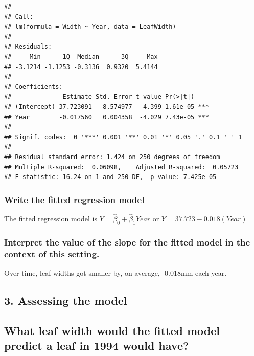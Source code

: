 \documentclass[]{article}
\begin{document}
\begin{verbatim}
## 
## Call:
## lm(formula = Width ~ Year, data = LeafWidth)
## 
## Residuals:
##     Min      1Q  Median      3Q     Max 
## -3.1214 -1.1253 -0.3136  0.9320  5.4144 
## 
## Coefficients:
##              Estimate Std. Error t value Pr(>|t|)    
## (Intercept) 37.723091   8.574977   4.399 1.61e-05 ***
## Year        -0.017560   0.004358  -4.029 7.43e-05 ***
## ---
## Signif. codes:  0 '***' 0.001 '**' 0.01 '*' 0.05 '.' 0.1 ' ' 1
## 
## Residual standard error: 1.424 on 250 degrees of freedom
## Multiple R-squared:  0.06098,    Adjusted R-squared:  0.05723 
## F-statistic: 16.24 on 1 and 250 DF,  p-value: 7.425e-05
\end{verbatim}

\hypertarget{write-the-fitted-regression-model}{%
\subsubsection{Write the fitted regression
model}\label{write-the-fitted-regression-model}}

The fitted regression model is \(Y = \hat{\beta}_0 + \hat{\beta}_1Year\)
or \(Y = 37.723 - 0.018(Year)\)

\hypertarget{interpret-the-value-of-the-slope-for-the-fitted-model-in-the-context-of-this-setting.}{%
\subsubsection{Interpret the value of the slope for the fitted model in
the context of this
setting.}\label{interpret-the-value-of-the-slope-for-the-fitted-model-in-the-context-of-this-setting.}}

Over time, leaf widths got smaller by, on average, -0.018mm each year.

\hypertarget{assessing-the-model}{%
\subsection{3. Assessing the model}\label{assessing-the-model}}

\hypertarget{what-leaf-width-would-the-fitted-model-predict-a-leaf-in-1994-would-have}{%
\subsection{What leaf width would the fitted model predict a leaf in
1994 would
have?}\label{what-leaf-width-would-the-fitted-model-predict-a-leaf-in-1994-would-have}}
\end{document}
